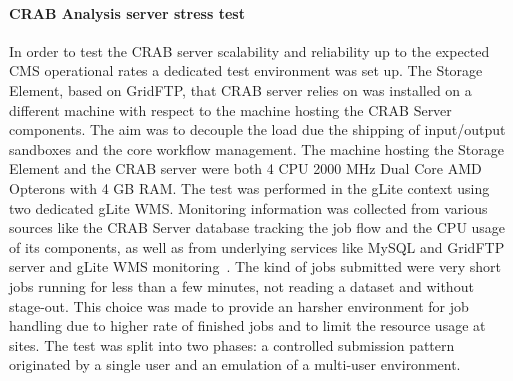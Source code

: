 \paragraph{CRAB Analysis server stress test} 
In order to test the CRAB server scalability and reliability up to
the expected CMS operational rates a dedicated test environment was
set up. The Storage Element, based on GridFTP, that CRAB server relies
on was installed on a different machine with respect to the machine
hosting the CRAB Server components. The aim was to decouple the load
due the shipping of input/output sandboxes and the core workflow
management. The machine hosting the Storage Element and the CRAB
server were both 4 CPU 2000 MHz Dual Core AMD Opterons with 4 GB
RAM. The test was performed in the gLite context using two dedicated
gLite WMS. Monitoring information was collected from various sources
like the CRAB Server database tracking the job flow and the CPU usage
of its components, as well as from underlying services like MySQL and
GridFTP server and gLite WMS monitoring~\cite{wmsMon}. The kind of
jobs submitted were very short jobs running for less than a few
minutes, not reading a dataset and without stage-out. This choice was
made to provide an harsher environment for job handling due to higher
rate of finished jobs and to limit the resource usage at sites.
The test was split into two phases: a controlled submission pattern
originated by a single user and an emulation of a multi-user
environment.

